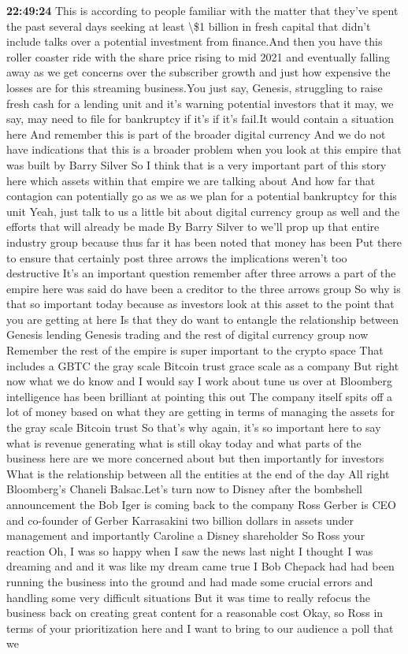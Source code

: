 \documentclass{article}%
\begin{document}
\textbf{22:49:24}%
\newline%
This is according to people familiar with the matter that they've spent the past several days seeking at least \textbackslash{}\$1 billion in fresh capital that didn't include talks over a potential investment from finance.And then you have this roller coaster ride with the share price rising to mid 2021 and eventually falling away as we get concerns over the subscriber growth and just how expensive the losses are for this streaming business.You just say, Genesis, struggling to raise fresh cash for a lending unit and it's warning potential investors that it may, we say, may need to file for bankruptcy if it's if it's fail.It would contain a situation here And remember this is part of the broader digital currency And we do not have indications that this is a broader problem when you look at this empire that was built by Barry Silver So I think that is a very important part of this story here which assets within that empire we are talking about And how far that contagion can potentially go as we as we plan for a potential bankruptcy for this unit Yeah, just talk to us a little bit about digital currency group as well and the efforts that will already be made By Barry Silver to we'll prop up that entire industry group because thus far it has been noted that money has been Put there to ensure that certainly post three arrows the implications weren't too destructive It's an important question remember after three arrows a part of the empire here was said do have been a creditor to the three arrows group So why is that so important today because as investors look at this asset to the point that you are getting at here Is that they do want to entangle the relationship between Genesis lending Genesis trading and the rest of digital currency group now Remember the rest of the empire is super important to the crypto space That includes a GBTC the gray scale Bitcoin trust grace scale as a company But right now what we do know and I would say I work about tune us over at Bloomberg intelligence has been brilliant at pointing this out The company itself spits off a lot of money based on what they are getting in terms of managing the assets for the gray scale Bitcoin trust So that's why again, it's so important here to say what is revenue generating what is still okay today and what parts of the business here are we more concerned about but then importantly for investors What is the relationship between all the entities at the end of the day All right Bloomberg's Chaneli Balsac.Let's turn now to Disney after the bombshell announcement the Bob Iger is coming back to the company Ross Gerber is CEO and co{-}founder of Gerber Karrasakini two billion dollars in assets under management and importantly Caroline a Disney shareholder So Ross your reaction Oh, I was so happy when I saw the news last night I thought I was dreaming and and it was like my dream came true I Bob Chepack had had been running the business into the ground and had made some crucial errors and handling some very difficult situations But it was time to really refocus the business back on creating great content for a reasonable cost Okay, so Ross in terms of your prioritization here and I want to bring to our audience a poll that we 
\end{document}
